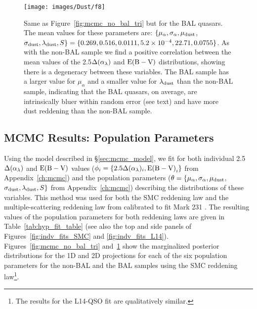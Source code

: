 \begin{figure*}
\begin{center}
\texttt{[image: images/Dust/f8]}
\caption[Best fit population parameters for BAL quasars]{\label{fig:mcmc_bal_tri} Same as Figure~\ref{fig:mcmc_no_bal_tri} but for the BAL quasars. 
The mean values for these parameters are: $\{ \mu_{\alpha}, \sigma_{\alpha}, \mu_{\rm dust}$, $\sigma_{\rm dust} ,\lambda_{\rm dust}, S \}=\{ 0.269,0.516,0.0111,5.2\times10^{-4},22.71,0.0755 \}$.
As with the non-BAL sample we find a positive correlation between the mean values of the 2.5$\Delta(\alpha_{\lambda})$ and ${\rm E(B-V)}$ distributions, showing there is a degeneracy between these variables.  The BAL sample has a larger value for $\mu_\alpha$ and a smaller value for $\lambda_{\rm dust}$ than the non-BAL sample, indicating that the BAL quasars, on average, are intrinsically bluer within random error (see text) and have more dust reddening than the non-BAL sample.}
\end{center}
\end{figure*}

\subsection{MCMC Results: Population Parameters} \label{sec:mcmc_results} 

Using the model described in \S\ref{sec:mcmc_model}, we fit for both individual 2.5$\Delta(\alpha_{\lambda})$ 
and ${\rm E(B-V)}$ values ($\phi_i=\{2.5\Delta(\alpha_{\lambda})_i, {\rm E(B-V)}_i \}$ from Appendix~\ref{ch:mcmc}) and the population parameters ($\theta=\{ \mu_{\alpha}, \sigma_{\alpha}, \mu_{\rm dust}$, $\sigma_{\rm dust} ,\lambda_{\rm dust}, S \}$ from Appendix~\ref{ch:mcmc}) describing the distributions of these variables.  This method was used for both the SMC reddening law and the multiple-scattering reddening law from \citet{Goobar:2008} calibrated to fit Mark 231 \citep[a BAL quasar;][]{Leighly:2014}.  The resulting values of the population parameters for both reddening laws are given in Table~\ref{tab:hyp_fit_table} (see also the top and side panels of Figures~\ref{fig:indv_fits_SMC} and \ref{fig:indv_fits_L14}). Figures~\ref{fig:mcmc_no_bal_tri} and~\ref{fig:mcmc_bal_tri} show the marginalized posterior distributions for the 1D and 2D projections for each of the six population parameters for the non-BAL and the BAL samples using the SMC reddening law\footnote{The results for the L14-QSO fit are qualitatively similar.}. 


